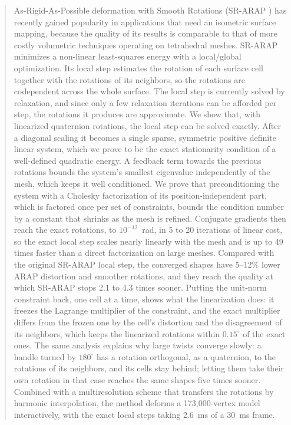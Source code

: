 \documentclass{birkjour}
\theoremstyle{remark}
\numberwithin{equation}{section}
\begin{document}
\begin{abstract}

As-Rigid-As-Possible deformation with Smooth Rotations (SR-ARAP \cite{Levi2015}) has recently gained popularity in applications that need an isometric surface mapping, because the quality of its results is comparable to that of more costly volumetric techniques operating on tetrahedral meshes. SR-ARAP minimizes a non-linear least-squares energy with a local/global optimization. Its local step estimates the rotation of each surface cell together with the rotations of its neighbors, so the rotations are codependent across the whole surface. The local step is currently solved by relaxation, and since only a few relaxation iterations can be afforded per step, the rotations it produces are approximate. We show that, with linearized quaternion rotations, the local step can be solved exactly. After a diagonal scaling it becomes a single sparse, symmetric positive definite linear system, which we prove to be the exact stationarity condition of a well-defined quadratic energy. A feedback term towards the previous rotations bounds the system's smallest eigenvalue independently of the mesh, which keeps it well conditioned. We prove that preconditioning the system with a Cholesky factorization of its position-independent part, which is factored once per set of constraints, bounds the condition number by a constant that shrinks as the mesh is refined. Conjugate gradients then reach the exact rotations, to $10^{-12}$~rad, in 5 to 20 iterations of linear cost, so the exact local step scales nearly linearly with the mesh and is up to 49 times faster than a direct factorization on large meshes. Compared with the original SR-ARAP local step, the converged shapes have 5--12\% lower ARAP distortion and smoother rotations, and they reach the quality at which SR-ARAP stops 2.1 to 4.3 times sooner. Putting the unit-norm constraint back, one cell at a time, shows what the linearization does: it freezes the Lagrange multiplier of the constraint, and the exact multiplier differs from the frozen one by the cell's distortion and the disagreement of its neighbors, which keeps the linearized rotations within $0.15^\circ$ of the exact ones. The same analysis explains why large twists converge slowly: a handle turned by $180^\circ$ has a rotation orthogonal, as a quaternion, to the rotations of its neighbors, and its cells stay behind; letting them take their own rotation in that case reaches the same shapes five times sooner. Combined with a multiresolution scheme that transfers the rotations by harmonic interpolation, the method deforms a 173{,}000-vertex model interactively, with the exact local steps taking 2.6~ms of a 30~ms frame.

\end{abstract}
\end{document}
